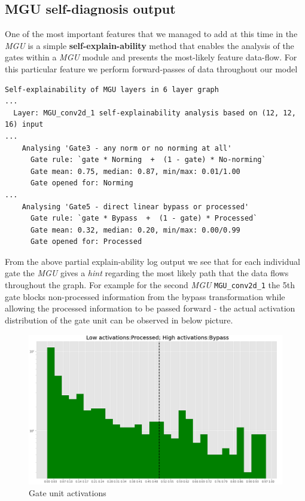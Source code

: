 \documentclass[11pt]{article}
\begin{document}
\hypertarget{mgu-self-diagnosis-output}{%
\subsection{MGU self-diagnosis output}\label{mgu-self-diagnosis-output}}

One of the most important features that we managed to add at this time
in the \emph{MGU} is a simple \textbf{self-explain-ability} method that
enables the analysis of the gates within a \emph{MGU} module and
presents the most-likely feature data-flow. For this particular feature
we perform forward-passes of data throughout our model

\begin{verbatim}
Self-explainability of MGU layers in 6 layer graph
...
  Layer: MGU_conv2d_1 self-explainability analysis based on (12, 12, 16) input
...
    Analysing 'Gate3 - any norm or no norming at all'
      Gate rule: `gate * Norming  +  (1 - gate) * No-norming`
      Gate mean: 0.75, median: 0.87, min/max: 0.01/1.00
      Gate opened for: Norming
...
    Analysing 'Gate5 - direct linear bypass or processed'
      Gate rule: `gate * Bypass  +  (1 - gate) * Processed`
      Gate mean: 0.32, median: 0.20, min/max: 0.00/0.99
      Gate opened for: Processed
\end{verbatim}

From the above partial explain-ability log output we see that for each
individual gate the \emph{MGU} gives a \emph{hint} regarding the most
likely path that the data flows throughout the graph. For example for
the second \emph{MGU} \texttt{MGU\_conv2d\_1} the 5th gate blocks
non-processed information from the bypass transformation while allowing
the processed information to be passed forward - the actual activation
distribution of the gate unit can be observed in below picture.

\begin{figure}
\centering
\includegraphics{img_proc_vs_bypass.png}
\caption{Gate unit activations}
\end{figure}
\end{document}
